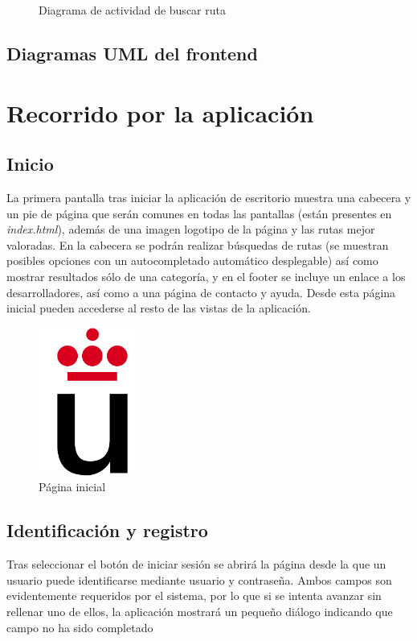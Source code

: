 \documentclass[11pt,a4paper]{article}
\begin{document}
\begin{figure}
\centering
\buscarruta
\caption{Diagrama de actividad de buscar ruta}
\label{fig:buscarruta}
\end{figure}

\subsection{Diagramas UML del frontend}

\clearpage

\section{Recorrido por la aplicación}
\subsection{Inicio}
La primera pantalla tras iniciar la aplicación de escritorio muestra una cabecera y un pie de página que serán comunes en todas las pantallas (están presentes en \textit{index.html}), además de una imagen logotipo de la página y las rutas mejor valoradas. En la cabecera se podrán realizar búsquedas de rutas (se muestran posibles opciones con un autocompletado automático desplegable) así como mostrar resultados sólo de una categoría, y en el footer se incluye un enlace a los desarrolladores, así como a una página de contacto y ayuda. Desde esta página inicial pueden accederse al resto de las vistas de la aplicación.
\begin{figure}[h]
\centering
  \includegraphics[width=0.3\textwidth]{./imagenes/logoURJC}
  \caption{Página inicial}
  \label{fig: Página inicial}
\end{figure}
\subsection{Identificación y registro}
Tras seleccionar el botón de iniciar sesión se abrirá la página desde la que un usuario puede identificarse mediante usuario y contraseña. Ambos campos son evidentemente requeridos por el sistema, por lo que si se intenta avanzar sin rellenar uno de ellos, la aplicación mostrará un pequeño diálogo indicando que campo no ha sido completado
\end{document}
